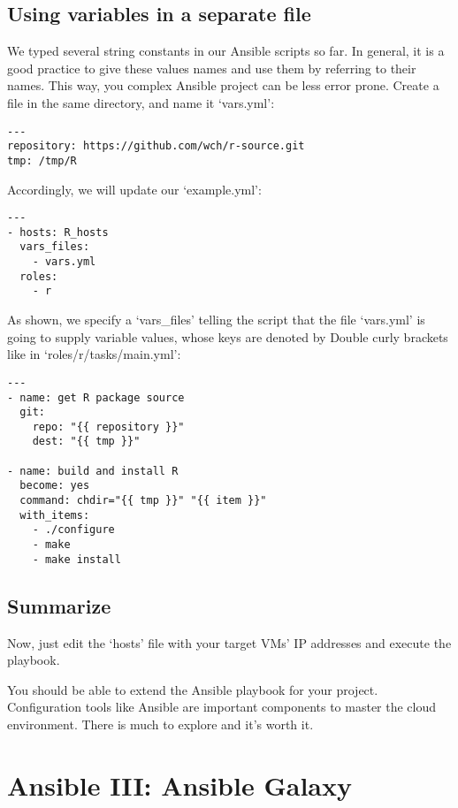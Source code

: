 \subsection{Using variables in a separate
file}\label{using-variables-in-a-separate-file}

We typed several string constants in our Ansible scripts so far. In
general, it is a good practice to give these values names and use them
by referring to their names. This way, you complex Ansible project can
be less error prone. Create a file in the same directory, and name it
`vars.yml':

\begin{verbatim}
---
repository: https://github.com/wch/r-source.git
tmp: /tmp/R
\end{verbatim}

Accordingly, we will update our `example.yml':

\begin{verbatim}
---
- hosts: R_hosts
  vars_files:
    - vars.yml
  roles:
    - r
\end{verbatim}

As shown, we specify a `vars\_files' telling the script that the file
`vars.yml' is going to supply variable values, whose keys are denoted by
Double curly brackets like in `roles/r/tasks/main.yml':

\begin{verbatim}
---
- name: get R package source
  git:
    repo: "{{ repository }}"
    dest: "{{ tmp }}"

- name: build and install R
  become: yes
  command: chdir="{{ tmp }}" "{{ item }}"
  with_items:
    - ./configure
    - make
    - make install
\end{verbatim}

\subsection{Summarize}\label{summarize}

Now, just edit the `hosts' file with your target VMs' IP addresses and
execute the playbook.

You should be able to extend the Ansible playbook for your project.
Configuration tools like Ansible are important components to master the
cloud environment. There is much to explore and it's worth it.
\section{Ansible III: Ansible Galaxy}\label{ansible-iii-ansible-galaxy}

